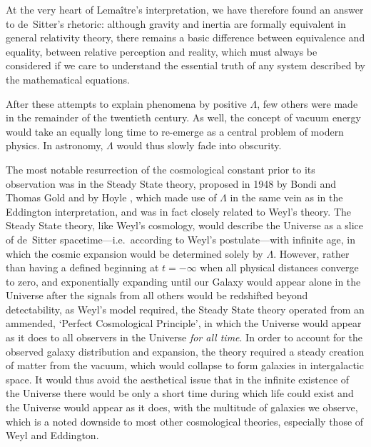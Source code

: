 At the very heart of Lema\^{i}tre's interpretation, we have therefore found an answer to de~Sitter's rhetoric: although gravity and inertia are formally equivalent in general relativity theory, there remains a basic difference between equivalence and equality, between relative perception and reality, which must always be considered if we care to understand the essential truth of any system described by the mathematical equations.

After these attempts to explain phenomena by positive $\Lambda$, few others were made in the remainder of the twentieth century. As well, the concept of vacuum energy would take an equally long time to re-emerge as a central problem of modern physics. In astronomy, $\Lambda$ would thus slowly fade into obscurity. 

The most notable resurrection of the cosmological constant prior to its observation was in the Steady State theory, proposed in 1948 by Bondi and Thomas Gold \cite{Bondi1948} and by Hoyle \cite{Hoyle1948}, which made use of $\Lambda$ in the same vein as in the Eddington interpretation, and was in fact closely related to Weyl's theory. The Steady State theory, like Weyl's cosmology, would describe the Universe as a slice of de~Sitter spacetime---i.e.~according to Weyl's postulate---with infinite age, in which the cosmic expansion would be determined solely by $\Lambda$. However, rather than having a defined beginning at $t=-\infty$ when all physical distances converge to zero, and exponentially expanding until our Galaxy would appear alone in the Universe after the signals from all others would be redshifted beyond detectability, as Weyl's model required, the Steady State theory operated from an ammended, `Perfect Cosmological Principle', in which the Universe would appear as it does to all observers in the Universe \textit{for all time}. In order to account for the observed galaxy distribution and expansion, the theory required a steady creation of matter from the vacuum, which would collapse to form galaxies in intergalactic space. It would thus avoid the aesthetical issue that in the infinite existence of the Universe there would be only a short time during which life could exist and the Universe would appear as it does, with the multitude of galaxies we observe, which is a noted downside to most other cosmological theories, especially those of Weyl and Eddington. 

